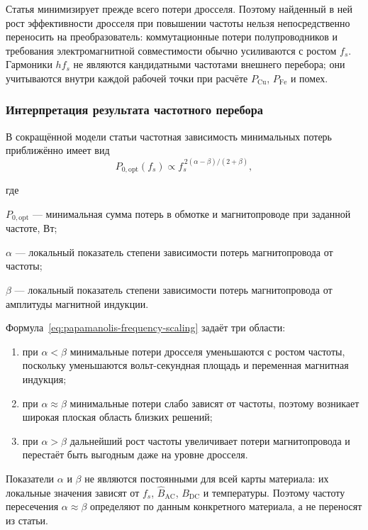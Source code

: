 \documentclass[14pt,a4paper]{extarticle}
\newenvironment{whereblock}
 {\par\noindent где\par
  \begin{list}{}{\setlength{\leftmargin}{12.5mm}
                  \setlength{\itemindent}{-12.5mm}
                  \setlength{\itemsep}{0pt}
                  \setlength{\parsep}{0pt}
                  \setlength{\topsep}{0pt}}}
 {\end{list}}
\newcommand{\whereitem}[2]{\item[] #1 --- #2}
\begin{document}
Статья минимизирует прежде всего потери дросселя. Поэтому найденный в ней
рост эффективности дросселя при повышении частоты нельзя непосредственно
переносить на преобразователь: коммутационные потери полупроводников и
требования электромагнитной совместимости обычно усиливаются с ростом
$f_s$. Гармоники $hf_s$ не являются кандидатными частотами внешнего
перебора; они учитываются внутри каждой рабочей точки при расчёте
$P_{\text{Cu}}$, $P_{\text{Fe}}$ и помех.

\subsubsection{Интерпретация результата частотного перебора}

В сокращённой модели статьи частотная зависимость минимальных потерь
приближённо имеет вид
\begin{equation}
 P_{0,\text{opt}}(f_s)\propto
 f_s^{\,2(\alpha-\beta)/(2+\beta)},
 \label{eq:papamanolis-frequency-scaling}
\end{equation}
\begin{whereblock}
\whereitem{$P_{0,\text{opt}}$}{минимальная сумма потерь в обмотке и
магнитопроводе при заданной частоте, Вт;}
\whereitem{$\alpha$}{локальный показатель степени зависимости потерь
магнитопровода от частоты;}
\whereitem{$\beta$}{локальный показатель степени зависимости потерь
магнитопровода от амплитуды магнитной индукции.}
\end{whereblock}

Формула~\eqref{eq:papamanolis-frequency-scaling} задаёт три области:
\begin{enumerate}
\item при $\alpha<\beta$ минимальные потери дросселя уменьшаются с ростом
частоты, поскольку уменьшаются вольт-секундная площадь и переменная
магнитная индукция;
\item при $\alpha\approx\beta$ минимальные потери слабо зависят от
частоты, поэтому возникает широкая плоская область близких решений;
\item при $\alpha>\beta$ дальнейший рост частоты увеличивает потери
магнитопровода и перестаёт быть выгодным даже на уровне дросселя.
\end{enumerate}

Показатели $\alpha$ и $\beta$ не являются постоянными для всей карты
материала: их локальные значения зависят от $f_s$,
$\widehat B_{\text{AC}}$, $B_{\text{DC}}$ и температуры. Поэтому
частоту пересечения $\alpha\approx\beta$ определяют по данным конкретного
материала, а не переносят из статьи.
\end{document}
